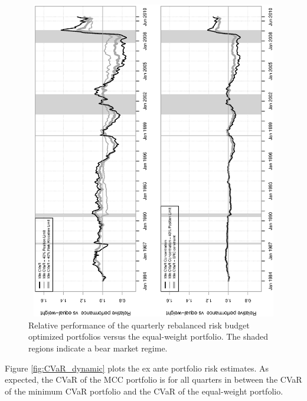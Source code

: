 \documentclass[12pt,a4paper]{article}
\begin{document}
\begin{figure}[tb]
\begin{center}
\caption{Relative performance of the quarterly rebalanced risk budget optimized portfolios versus the equal-weight portfolio. The shaded regions indicate a bear market regime.  \label{fig:relperformance}}
\includegraphics[width=12cm,height=14cm,angle=270]{RelPerf_EW_CC.eps}
\end{center}
\end{figure}

Figure \ref{fig:CVaR_dynamic} plots the ex ante portfolio risk estimates. As expected, the CVaR of the MCC portfolio is for all quarters in between the CVaR of the minimum CVaR portfolio and the CVaR of the equal-weight portfolio.
\end{document}

